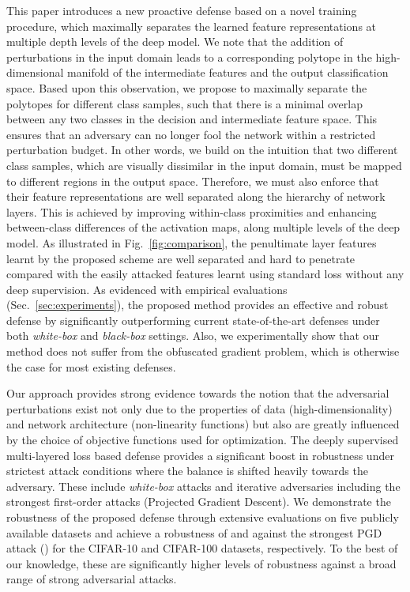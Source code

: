 \documentclass[10pt,twocolumn,letterpaper]{article}
\begin{document}
This paper introduces a new proactive defense based on a novel training procedure, which maximally separates the learned feature representations at multiple depth levels of the deep model. We note that the addition of perturbations in the input domain leads to a corresponding polytope in the high-dimensional manifold of the intermediate features and the output classification space. Based upon this observation, we propose to maximally separate the polytopes for different class samples, such that there is a minimal overlap between any two classes in the decision and intermediate feature space. This ensures that an adversary can no longer fool the network within a restricted perturbation budget. In other words, we build on the intuition that two different class samples, which are visually dissimilar in the input domain, must be mapped to different regions in the output space. Therefore, we must also enforce that their feature representations are well separated along the hierarchy of network layers. This is achieved by improving within-class proximities and enhancing between-class differences of the activation maps, along multiple levels of the deep model. As illustrated in Fig.~\ref{fig:comparison}, the penultimate layer features learnt by the proposed scheme are well separated and hard to penetrate compared with the easily attacked features learnt using standard loss without any deep supervision. As evidenced with empirical evaluations (Sec.~\ref{sec:experiments}), the proposed method provides an effective and robust defense by significantly outperforming current state-of-the-art defenses under both \textit{white-box} and \textit{black-box} settings. Also, we experimentally show that our method does not suffer from the obfuscated gradient problem, which is otherwise the case for most existing defenses.





Our approach provides strong evidence towards the notion that the adversarial perturbations exist not only due to the properties of data (\eg high-dimensionality) and network architecture (\eg non-linearity functions) but also are greatly influenced by the choice of objective functions used for optimization. The deeply supervised multi-layered loss based defense provides a significant boost in robustness under strictest attack conditions where the balance is shifted heavily towards the adversary. These include \emph{white-box} attacks and iterative adversaries including the strongest first-order attacks (Projected Gradient Descent). We demonstrate the robustness of the proposed defense through extensive evaluations on five publicly available datasets and achieve a robustness of  and  against the strongest PGD attack () for the CIFAR-10 and CIFAR-100 datasets, respectively. To the best of our knowledge, these are significantly higher levels of robustness against a broad range of strong adversarial attacks.
\end{document}
